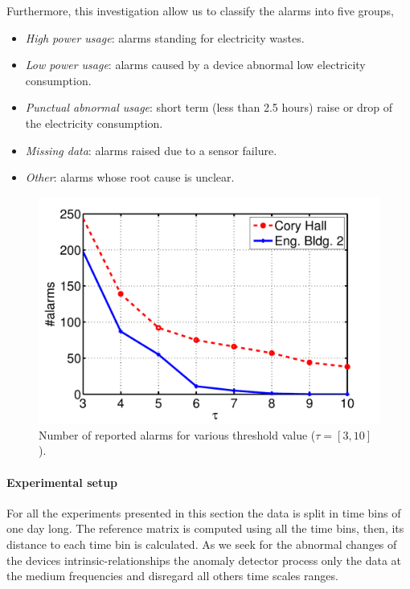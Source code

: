 Furthermore, this investigation allow us to classify the alarms into five groups,
\begin{itemize}
 \item \emph{High power usage}: alarms standing for electricity wastes.
 \item \emph{Low power usage}: alarms caused by a device abnormal low electricity consumption.
 \item \emph{Punctual abnormal usage}: short term (less than 2.5 hours) raise or drop of the electricity consumption.
 \item \emph{Missing data}: alarms raised due to a sensor failure.
 \item \emph{Other}: alarms whose root cause is unclear.
\end{itemize}


\begin{figure}
\begin{center}
 \includegraphics[width=.49\textwidth]{img/threshold-eps-converted-to.pdf}
 \caption{Number of reported alarms for various threshold value ($\tau=[3,10]$).}
 \label{fig:thres}
 \end{center}
\end{figure}

\paragraph{Experimental setup}
For all the experiments presented in this section the data is split in time bins of one day long.
The reference matrix is computed using all the time bins, then, its distance to each time bin is calculated.
As we seek for the abnormal changes of the devices intrinsic-relationships the anomaly detector process only the data at the medium frequencies and disregard all others time scales ranges.

